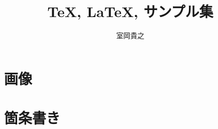 \documentclass{jsarticle}
\begin{document}
\title{\TeX, \LaTeX, \LaTeXe サンプル集}
\author{室岡貴之}
\maketitle

\section{画像}
\section{箇条書き}
\end{document}
